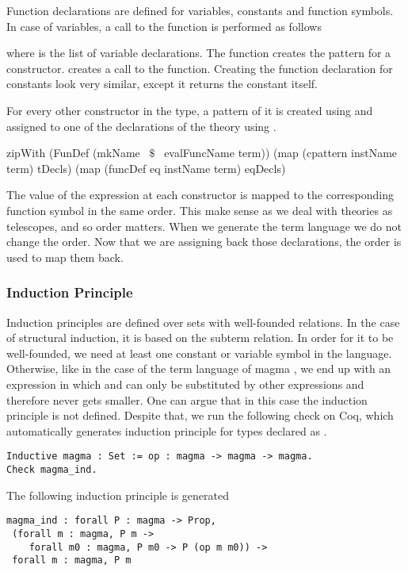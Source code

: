 Function declarations are defined for variables, constants and function symbols. In case of variables, a call to the  function is performed as follows 
\begin{hscode}
\end{hscode}
where  is the list of variable declarations. The function  creates the pattern for a constructor.  creates a call to the  function. Creating the function declaration for constants look very similar, except it returns the constant itself. 
\begin{hscode}
\end{hscode}
For every other constructor in the type, a pattern of it is created using  and assigned to one of the declarations of the theory using . 
\begin{hscode}
zipWith (FunDef (mkName ~$\$$~  evalFuncName term)) 
        (map (cpattern instName term) tDecls)
        (map (funcDef eq instName term) eqDecls)
\end{hscode}
The value of the expression at each constructor is mapped to the corresponding function symbol in the same order. This make sense as we deal with theories as telescopes, and so order matters. When we generate the term language we do not change the order. Now that we are assigning back those declarations, the order is used to map them back. 


\subsubsection{Induction Principle}
\label{sec:generation:induction}
Induction principles are defined over sets with well-founded relations. In the case of structural induction, it is based on the subterm relation. In order for it to be well-founded, we need at least one constant or variable symbol in the language. Otherwise, like in the case of the  term language of magma , we end up with an expression  in which  and  can only be substituted by other  expressions and therefore never gets smaller. One can argue that in this case the induction principle is not defined. Despite that, we run the following check on Coq, which automatically generates induction principle for types declared as . 
 \begin{verbatim}
Inductive magma : Set := op : magma -> magma -> magma.
Check magma_ind.
\end{verbatim}
The following induction principle is generated 
\begin{verbatim}
magma_ind : forall P : magma -> Prop,
 (forall m : magma, P m ->
    forall m0 : magma, P m0 -> P (op m m0)) ->
 forall m : magma, P m
\end{verbatim}

